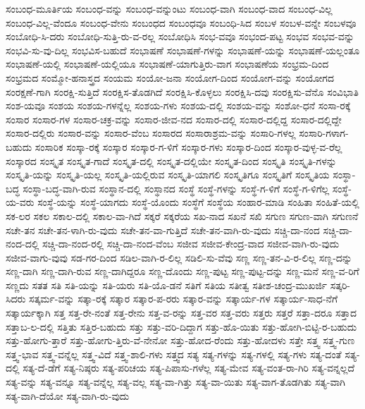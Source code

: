{ಸಂಬಂಧ-ಮೂರ್ತಿಯ
ಸಂಬಂಧ-ವನ್ನು
ಸಂಬಂಧ-ವನ್ನುಂಟು
ಸಂಬಂಧ-ವಾಗಿ
ಸಂಬಂಧ-ವಾದ
ಸಂಬಂಧ-ವಿಲ್ಲ
ಸಂಬಂಧ-ವಿಲ್ಲ-ವೆಂದೂ
ಸಂಬಂಧ-ವೇನು
ಸಂಬಂಧದ
ಸಂಬಂಧವೂ
ಸಂಬಂಧಿ-ಸಿದ
ಸಂಬಳ
ಸಂಬಳ-ವನ್ನೇ
ಸಂಬಳವೂ
ಸಂಬೋಧಿ-ಸಿ-ದರು
ಸಂಬೋಧಿ-ಸುತ್ತಿ-ರು-ವ-ರಲ್ಲ
ಸಂಬೋಧಿಸಿ
ಸಂಭ-ವವೂ
ಸಂಭಂದ-ಪಟ್ಟ
ಸಂಭವ
ಸಂಭವ-ವನ್ನು
ಸಂಭವಿ-ಸು-ವು-ದಿಲ್ಲ
ಸಂಭವಿಸ-ಬಹುದೆ
ಸಂಭಾಷಣೆ
ಸಂಭಾಷಣೆ-ಗಳನ್ನು
ಸಂಭಾಷಣೆ-ಯನ್ನು
ಸಂಭಾಷಣೆ-ಯಲ್ಲಂತೂ
ಸಂಭಾಷಣೆ-ಯಲ್ಲಿ
ಸಂಭಾಷಣೆ-ಯಲ್ಲಿಯೂ
ಸಂಭಾಷಣೆ-ಯಾಗುತ್ತಿರು-ವಾಗ
ಸಂಭಾಷಣೆಯ
ಸಂಭ್ರಮ-ದಿಂದ
ಸಂಭ್ರಮದ
ಸಂಮ್ಮೋ-ಹನಾಸ್ತ್ರದ
ಸಂಯಮ
ಸಂಯೋ-ಜನಾ
ಸಂಯೋಗ-ದಿಂದ
ಸಂಯೋಗ-ವನ್ನು
ಸಂಯೋಗದ
ಸಂರಕ್ಷಣೆ-ಗಾಗಿ
ಸಂರಕ್ಷಿ-ಸುತ್ತಿದೆ
ಸಂರಕ್ಷಿಸ-ತೊಡಗಿದೆ
ಸಂರಕ್ಷಿಸಿ-ಕೊಳ್ಳಲು
ಸಂರಕ್ಷಿಸಿ-ದವು
ಸಂರಕ್ಷಿಸು-ವೆನೊ
ಸಂವಿಭಾತಿ
ಸಂಶ-ಯವೂ
ಸಂಶಯ
ಸಂಶಯ-ಗಳನ್ನೆಲ್ಲ
ಸಂಶಯ-ಗಳು
ಸಂಶಯ-ದಲ್ಲಿ
ಸಂಶಯ-ವನ್ನು
ಸಂಶೋ-ಧನೆ
ಸಂಸಾ-ರಕ್ಕೆ
ಸಂಸಾರ
ಸಂಸಾರ-ಗಳ
ಸಂಸಾರ-ಚಕ್ರ-ವನ್ನು
ಸಂಸಾರ-ಜೀವ-ನದ
ಸಂಸಾರ-ದಲ್ಲಿ
ಸಂಸಾರ-ದಲ್ಲಿದ್ದ
ಸಂಸಾರ-ದಲ್ಲಿದ್ದೇ
ಸಂಸಾರ-ದಲ್ಲಿರು
ಸಂಸಾರ-ವನ್ನು
ಸಂಸಾರ-ವೆಂಬ
ಸಂಸಾರದ
ಸಂಸಾರಾಶ್ರಮ-ವನ್ನು
ಸಂಸಾರಿ-ಗಳಲ್ಲ
ಸಂಸಾರಿ-ಗಳಾಗ-ಬಹುದು
ಸಂಸಾರಿಕ
ಸಂಸ್ಕಾ-ರಕ್ಕೆ
ಸಂಸ್ಕಾರ
ಸಂಸ್ಕಾರ-ಗ-ಳಿಗೆ
ಸಂಸ್ಕಾರ-ಗಳು
ಸಂಸ್ಕಾರ-ದಿಂದ
ಸಂಸ್ಕಾರ-ವುಳ್ಳ-ವ-ರೆಲ್ಲ
ಸಂಸ್ಕಾರದ
ಸಂಸ್ಕೃತ
ಸಂಸ್ಕೃತ-ಗಾದೆ
ಸಂಸ್ಕೃತ-ದಲ್ಲಿ
ಸಂಸ್ಕೃತ-ದಲ್ಲಿಯೇ
ಸಂಸ್ಕೃತ-ದಿಂದ
ಸಂಸ್ಕೃತಿ
ಸಂಸ್ಕೃತಿ-ಗಳನ್ನು
ಸಂಸ್ಕೃತಿ-ಯನ್ನು
ಸಂಸ್ಕೃತಿ-ಯಲ್ಲ
ಸಂಸ್ಕೃತಿ-ಯಲ್ಲಿರುವ
ಸಂಸ್ಕೃತಿ-ಯಾಗಲಿ
ಸಂಸ್ಕೃತಿಗೂ
ಸಂಸ್ಕೃತಿಗೆ
ಸಂಸ್ಕೃತಿಯ
ಸಂಸ್ಥಾ-ಬದ್ಧ
ಸಂಸ್ಥಾ-ಬದ್ಧ-ವಾಗಿ-ರುವ
ಸಂಸ್ಥಾನ-ದಲ್ಲಿ
ಸಂಸ್ಥಾನದ
ಸಂಸ್ಥೆ
ಸಂಸ್ಥೆ-ಗಳನ್ನು
ಸಂಸ್ಥೆ-ಗ-ಳಿಗೆ
ಸಂಸ್ಥೆ-ಗ-ಳಿಗೆಲ್ಲ
ಸಂಸ್ಥೆ-ಯ-ವರು
ಸಂಸ್ಥೆ-ಯನ್ನು
ಸಂಸ್ಥೆ-ಯಾಗದು
ಸಂಸ್ಥೆ-ಯೊಂದು
ಸಂಸ್ಥೆಗೆ
ಸಂಸ್ಥೆಯ
ಸಂಹಾರ-ಮಾಡಿ
ಸಂಹಿತಾ
ಸಂಹಿತೆ-ಯಲ್ಲಿ
ಸಕ-ಲರ
ಸಕಲ
ಸಕಾಲ-ದಲ್ಲಿ
ಸಕಾಲ-ವಾ-ಗಿದೆ
ಸಕ್ಕರೆ
ಸಕ್ಕರೆಯ
ಸಖ-ನಾದ
ಸಖನೆ
ಸಖಿ
ಸಗುಣ
ಸಗುಣ-ವಾಗಿ
ಸಗುಣನೆ
ಸಚೇ-ತನ
ಸಚೇ-ತನ-ಳಾಗಿ-ರು-ವುದು
ಸಚೇ-ತನ-ವಾ-ಗುತ್ತಿದೆ
ಸಚೇ-ತನ-ವಾಗಿ-ರು-ವುದು
ಸಚ್ಚಿ-ದಾ-ನಂದ
ಸಚ್ಚಿ-ದಾ-ನಂದ-ದಲ್ಲಿ
ಸಚ್ಚಿ-ದಾ-ನಂದ-ರಲ್ಲಿ
ಸಚ್ಚಿ-ದಾ-ನಂದ-ವೆಂಬ
ಸಜೀವ
ಸಜೀವ-ಕೇಂದ್ರ-ವಾದ
ಸಜೀವ-ವಾಗಿ-ರು-ವುದು
ಸಜೀವ-ವಾಗು-ವುವು
ಸಡ-ಗರ-ದಿಂದ
ಸಡಿಲ-ವಾಗಿ-ರ-ಲಿಲ್ಲ
ಸಡಿಲಿ-ಸು-ವೆವು
ಸಣ್ಣ
ಸಣ್ಣ-ತನ-ವಿ-ರ-ಲಿಲ್ಲ
ಸಣ್ಣ-ದನ್ನು
ಸಣ್ಣ-ದಾಗಿ
ಸಣ್ಣ-ದಾಗಿ-ರುವ
ಸಣ್ಣ-ದಾಗಿದ್ದರೂ
ಸಣ್ಣ-ದೊಂದು
ಸಣ್ಣ-ಪುಟ್ಟ
ಸಣ್ಣ-ಪುಟ್ಟ-ದನ್ನು
ಸಣ್ಣ-ಮನೆ
ಸಣ್ಣ-ವ-ರಿಗೆ
ಸಣ್ಣದು
ಸತತ
ಸತಿ
ಸತಿ-ಯನ್ನು
ಸತಿ-ಯರು
ಸತಿ-ಯೊ-ಡನೆ
ಸತಿಗೆ
ಸತಿಯ
ಸತೀತ್ವ
ಸತೀಶ-ಚಂದ್ರ-ಮುಖರ್ಜಿ
ಸತ್ಕರಿ-ಸಿದರು
ಸತ್ಕರ್ಮ-ವನ್ನು
ಸತ್ಕಾ-ರಕ್ಕೆ
ಸತ್ಕಾರ
ಸತ್ಕಾರ-ಪ-ರರು
ಸತ್ಕಾರ-ವನ್ನು
ಸತ್ಕಾರ್ಯ-ಗಳ
ಸತ್ಕಾರ್ಯ-ಸಾಧ-ನೆಗೆ
ಸತ್ಕಾರ್ಯಕ್ಕಾಗಿ
ಸತ್ತ
ಸತ್ತ-ರೇ-ನಂತೆ
ಸತ್ತ-ರೇನು
ಸತ್ತ-ವ-ರನ್ನು
ಸತ್ತ-ವರ
ಸತ್ತ-ವರು
ಸತ್ತರು
ಸತ್ತರೆ
ಸತ್ತಾ-ದರೂ
ಸತ್ತಾದ
ಸತ್ತಾಬ-ಲ-ದಲ್ಲಿ
ಸತ್ತಿತು
ಸತ್ತಿರ-ಬಹುದು
ಸತ್ತು
ಸತ್ತು-ವರಿ-ದಿದ್ದಾಗ
ಸತ್ತು-ಹೊ-ಯಿತು
ಸತ್ತು-ಹೋಗಿ-ಬಿಟ್ಟಿ-ರ-ಬಹುದು
ಸತ್ತು-ಹೋಗು-ತ್ತಾರೆ
ಸತ್ತು-ಹೋಗು-ತ್ತಿರು-ವೆ-ನೇನೋ
ಸತ್ತು-ಹೋದ-ರೆಂದು
ಸತ್ತು-ಹೋದಳು
ಸತ್ತೇ
ಸತ್ತ್ವ
ಸತ್ತ್ವ-ಗುಣ
ಸತ್ತ್ವ-ಭಾವ
ಸತ್ತ್ವ-ವನ್ನೆಲ್ಲ
ಸತ್ತ್ವ-ವಿದೆ
ಸತ್ತ್ವ-ಶಾಲಿ-ಗಳು
ಸತ್ತ್ವದ
ಸತ್ಯ
ಸತ್ಯ-ಗಳನ್ನು
ಸತ್ಯ-ಗಳಲ್ಲಿ
ಸತ್ಯ-ಗಳು
ಸತ್ಯ-ದಂತೆ
ಸತ್ಯ-ದಲ್ಲಿ
ಸತ್ಯ-ದೆ-ಡೆಗೆ
ಸತ್ಯ-ನಿಷ್ಠರು
ಸತ್ಯ-ಪರಿಚಯ
ಸತ್ಯ-ಪಿಪಾಸು-ಗಳೆಲ್ಲ
ಸತ್ಯ-ಮೇವ
ಸತ್ಯ-ವಂತ-ರಾ-ಗಿರಿ
ಸತ್ಯ-ವನ್ನಲ್ಲದೆ
ಸತ್ಯ-ವನ್ನು
ಸತ್ಯ-ವನ್ನೂ
ಸತ್ಯ-ವನ್ನೆಲ್ಲ
ಸತ್ಯ-ವಲ್ಲ
ಸತ್ಯ-ವಾ-ಗಿತ್ತು
ಸತ್ಯ-ವಾ-ಯಿತು
ಸತ್ಯ-ವಾಗ-ತೊಡಗಿತು
ಸತ್ಯ-ವಾಗಿ
ಸತ್ಯ-ವಾಗಿ-ದೆಯೋ
ಸತ್ಯ-ವಾಗಿ-ರು-ವುದು
}
